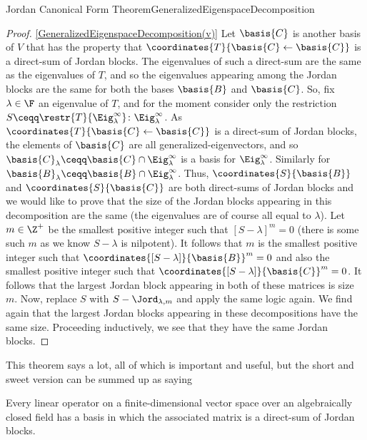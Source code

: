 \begin{thm}{Jordan Canonical Form Theorem}{GeneralizedEigenspaceDecomposition}
\begin{proof}
		\blni
		\cref{GeneralizedEigenspaceDecomposition(v)} Let $\basis{C}$ is another basis of $V$ that has the property that $\coordinates{T}{\basis{C}\leftarrow \basis{C}}$ is a direct-sum of Jordan blocks.  The eigenvalues of such a direct-sum are the same as the eigenvalues of $T$, and so the eigenvalues appearing among the Jordan blocks are the same for both the bases $\basis{B}$ and $\basis{C}$.  So, fix $\lambda \in \F$ an eigenvalue of $T$, and for the moment consider only the restriction $S\ceqq \restr{T}{\Eig _{\lambda}^{\infty}}\colon \Eig _{\lambda}^{\infty}$.  As $\coordinates{T}{\basis{C}\leftarrow \basis{C}}$ is a direct-sum of Jordan blocks, the elements of $\basis{C}$ are all generalized-eigenvectors, and so $\basis{C}_{\lambda}\ceqq \basis{C}\cap \Eig _{\lambda}^{\infty}$ is a basis for $\Eig _{\lambda}^{\infty}$.  Similarly for $\basis{B}_{\lambda}\ceqq \basis{B}\cap \Eig _{\lambda}^{\infty}$.  Thus, $\coordinates{S}{\basis{B}}$ and $\coordinates{S}{\basis{C}}$ are both direct-sums of Jordan blocks and we would like to prove that the size of the Jordan blocks appearing in this decomposition are the same (the eigenvalues are of course all equal to $\lambda$).  Let $m\in \Z ^+$ be the smallest positive integer such that $[S-\lambda ]^m=0$ (there is some such $m$ as we know $S-\lambda$ is nilpotent).  It follows that $m$ is the smallest positive integer such that $\coordinates{[S-\lambda ]}{\basis{B}}^m=0$ and also the smallest positive integer such that $\coordinates{[S-\lambda ]}{\basis{C}}^m=0$.  It follows that the largest Jordan block appearing in both of these matrices is size $m$.  Now, replace $S$ with $S-\Jord _{\lambda ,m}$ and apply the same logic again.  We find again that the largest Jordan blocks appearing in these decompositions have the same size.  Proceeding inductively, we see that they have the same Jordan blocks.
	\end{proof}
\end{thm}
This theorem says a lot, all of which is important and useful, but the short and sweet version can be summed up as saying
\begin{displayquote}
	Every linear operator on a finite-dimensional vector space over an algebraically closed field has a basis in which the associated matrix is a direct-sum of Jordan blocks.
\end{displayquote}

